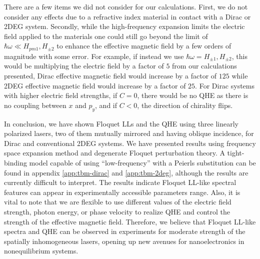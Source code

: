 \documentclass[aps,prb,twocolumn,showpacs,superscriptaddress]{revtex4-2}
\begin{document}
There are a few items we did not consider for our calculations.
First, we do not consider any effects due to a refractive index material in contact with a Dirac or 2DEG system.
Secondly, while the high-frequency expansion limits the electric field applied to the materials one could still go beyond the limit of $\hbar \omega \ll H_{pm1}, H_{\pm2}$ to enhance the effective magnetic field by a few orders of magnitude with some error.
For example, if instead we use $\hbar\omega = H_{\pm1}, H_{\pm2}$, this would be multiplying the electric field by a factor of $5$ from our calculations presented, Dirac effective magnetic field would increase by a factor of $125$ while 2DEG effective magnetic field would increase by a factor of $25$.
For Dirac systems with higher electric field strengths, if $C=0$, there would be no QHE as there is no coupling between $x$ and $p_y$, and if $C<0$, the direction of chirality flips.

In conclusion, we have shown Floquet LLs and the QHE using three linearly polarized lasers, two of them mutually mirrored and having oblique incidence, for Dirac and conventional 2DEG systems.
We have presented results using frequency space expansion method and degenerate Floquet perturbation theory.
A tight-binding model capable of using ``low-frequency'' with a Peierls substitution can be found in appendix \ref{app:tbm-dirac} and \ref{app:tbm-2deg}, although the results are currently difficult to interpret.
The results indicate Floquet LL-like spectral features can appear in experimentally accessible parameters range.
Also, it is vital to note that we are flexible to use different values of the electric field strength, photon energy, or phase velocity to realize QHE and control the strength of the effective magnetic field.
Therefore, we believe that Floquet LL-like spectra and QHE can be observed in experiments for moderate strength of the spatially inhomogeneous lasers, opening up new avenues for nanoelectronics in nonequilibrium systems.


\end{document}
